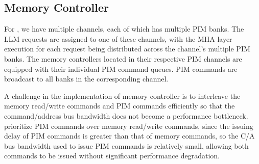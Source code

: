 \subsection{Memory Controller}
%
For \neupims, we have multiple channels, each of which has multiple PIM banks. 
%
The LLM requests are assigned to one of these channels, with the MHA layer execution for each request being distributed across the channel's multiple PIM banks.
%
The memory controllers located in their respective PIM channels are equipped with their individual PIM command queues.
%
PIM commands are broadcast to all banks in the corresponding channel.
%

%
A challenge in the implementation of \neupims memory controller is to interleave the memory read/write commands and PIM commands efficiently so that the command/address bus bandwidth does not become a performance bottleneck.
%
\neupims prioritize PIM commands over memory read/write commands, since the issuing delay of PIM commands is greater than that of memory commands, so the C/A bus bandwidth used to issue PIM commands is relatively small, allowing both commands to be issued without significant performance degradation.
